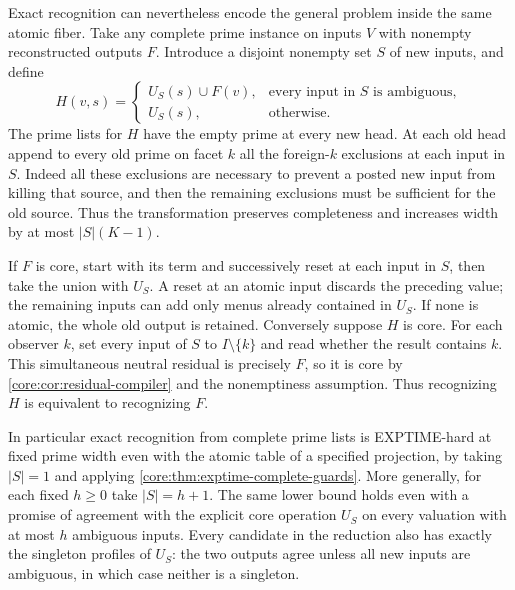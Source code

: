 Exact recognition can nevertheless encode the general problem
inside the same atomic fiber. Take any complete prime instance
on inputs $V$ with nonempty reconstructed outputs $F$. Introduce
a disjoint nonempty set $S$ of new inputs, and define
\[
 H(v,s)=
 \begin{cases}
 U_S(s)\cup F(v),&\text{every input in }S\text{ is ambiguous},\\
 U_S(s),&\text{otherwise}.
 \end{cases}
\]
The prime lists for $H$ have the empty prime at every new head.
At each old head append to every old prime on facet $k$ all the
foreign-$k$ exclusions at each input in $S$. Indeed all these
exclusions are necessary to prevent a posted new input from
killing that source, and then the remaining exclusions must be
sufficient for the old source. Thus the transformation preserves
completeness and increases width by at most $|S|(K-1)$.

If $F$ is core, start with its term and successively reset at
each input in $S$, then take the union with $U_S$. A reset at an
atomic input discards the preceding value; the remaining inputs
can add only menus already contained in $U_S$. If none is atomic,
the whole old output is retained. Conversely suppose $H$ is core.
For each observer $k$, set every input of $S$ to
$I\setminus\{k\}$ and read whether the result contains $k$.
This simultaneous neutral residual is precisely $F$, so it is core
by \cref{core:cor:residual-compiler} and the nonemptiness assumption.
Thus recognizing $H$ is equivalent to recognizing $F$.

In particular exact recognition from complete prime lists is
EXPTIME-hard at fixed prime width even with the atomic table of
a specified projection, by taking $|S|=1$ and applying
\cref{core:thm:exptime-complete-guards}. More generally, for
each fixed $h\ge0$ take $|S|=h+1$. The same lower bound holds
even with a promise of agreement with the explicit core operation
$U_S$ on every valuation with at most $h$ ambiguous inputs.
Every candidate in the reduction also has exactly the singleton
profiles of $U_S$: the two outputs agree unless all new inputs
are ambiguous, in which case neither is a singleton.

